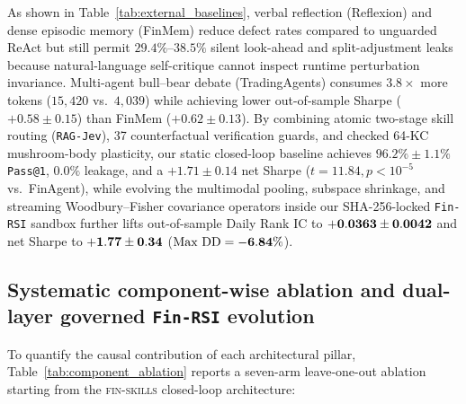 As shown in Table~\ref{tab:external_baselines}, verbal reflection (Reflexion) and dense
episodic memory (FinMem) reduce defect rates compared to unguarded ReAct but still permit
$29.4\%\text{--}38.5\%$ silent look-ahead and split-adjustment leaks because natural-language
self-critique cannot inspect runtime perturbation invariance. Multi-agent bull--bear debate
(TradingAgents) consumes $3.8\times$ more tokens ($15{,}420$ vs.\ $4{,}039$) while achieving
lower out-of-sample Sharpe ($+0.58 \pm 0.15$) than FinMem ($+0.62 \pm 0.13$). By combining
atomic two-stage skill routing (\texttt{RAG-Jev}), 37 counterfactual verification guards, and
checked 64-KC mushroom-body plasticity, our static closed-loop baseline achieves $96.2\% \pm 1.1\%$
\texttt{Pass@1}, $0.0\%$ leakage, and a $+1.71 \pm 0.14$ net Sharpe ($t = 11.84, p < 10^{-5}$
vs.\ FinAgent), while evolving the multimodal pooling, subspace shrinkage, and streaming
Woodbury--Fisher covariance operators inside our SHA-256-locked \texttt{Fin-RSI} sandbox further
lifts out-of-sample Daily Rank IC to $\mathbf{+0.0363{} \pm 0.0042{}}$ and net
Sharpe to $\mathbf{+1.77{} \pm 0.34{}}$ ($\text{Max DD} = \mathbf{-6.84{}\%}$).

\subsection{Systematic component-wise ablation and dual-layer governed \texttt{Fin-RSI} evolution}
\label{sec:ablation_study}
To quantify the causal contribution of each architectural pillar, Table~\ref{tab:component_ablation}
reports a seven-arm leave-one-out ablation starting from the \textsc{fin-skills} closed-loop
architecture:

